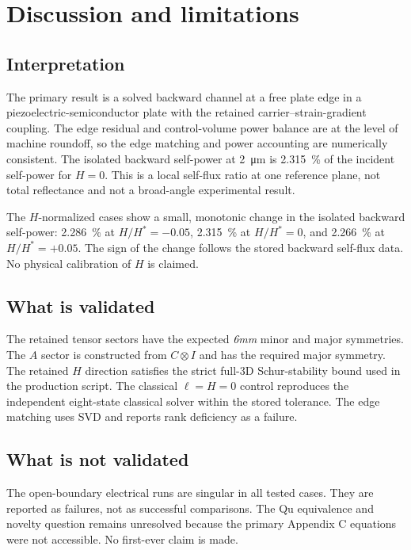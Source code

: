 \section{Discussion and limitations}\label{sec:discussion}

\subsection{Interpretation}
The primary result is a solved backward channel at a free plate edge in a
piezoelectric-semiconductor plate with the retained carrier--strain-gradient
coupling. The edge residual and control-volume power balance are at the level of
machine roundoff, so the edge matching and power accounting are numerically
consistent. The isolated backward self-power at \SI{2}{\micro\metre} is
\SI{2.315}{\percent} of the incident self-power for \(H=0\). This is a local
self-flux ratio at one reference plane, not total reflectance and not a
broad-angle experimental result.

The \(H\)-normalized cases show a small, monotonic change in the isolated
backward self-power: \SI{2.286}{\percent} at \(H/H^*=-0.05\), \SI{2.315}{\percent}
at \(H/H^*=0\), and \SI{2.266}{\percent} at \(H/H^*=+0.05\). The sign of the
change follows the stored backward self-flux data. No physical calibration of
\(H\) is claimed.

\subsection{What is validated}
The retained tensor sectors have the expected \textit{6mm} minor and major
symmetries. The \(A\) sector is constructed from \(C\otimes I\) and has the
required major symmetry. The retained \(H\) direction satisfies the strict full-3D
Schur-stability bound used in the production script. The classical
\(\ell=H=0\) control reproduces the independent eight-state classical solver within
the stored tolerance. The edge matching uses SVD and reports rank deficiency as a
failure.

\subsection{What is not validated}
The open-boundary electrical runs are singular in all tested cases. They are
reported as failures, not as successful comparisons. The Qu equivalence and novelty
question remains unresolved because the primary Appendix C equations were not
accessible. No first-ever claim is made.


